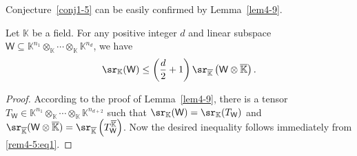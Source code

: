 Conjecture~\ref{conj1-5} can be easily confirmed by Lemma~\ref{lem4-9}.
\begin{theorem}
\label{thm:slrank-conj}
Let $\mathbb{K}$ be a field.  For any positive integer $d$ and linear subspace $\mathsf{W} \subseteq \mathbb{K}^{n_1} \otimes_{\mathbb{K}} \cdots \otimes_{\mathbb{K}} \mathbb{K}^{n_d}$,  we have 
\[
\sr_{\mathbb{K}}(\mathsf{W}) \le \left( \frac{d}{2} + 1\right)\sr_{\overline{\mathbb{K}}}\left( \mathsf{W} \otimes \overline{\mathbb{K}} \right).
\]
\end{theorem}
\begin{proof}
According to the proof of Lemma~\ref{lem4-9},  there is a tensor $T_{\mathsf{W}} \in \mathbb{K}^{n_1} \otimes_{\mathbb{K}} \cdots \otimes_{\mathbb{K}}  \mathbb{K}^{n_{d+2}}$ such that $\sr_{\mathbb{K}}(\mathsf{W})= \sr_{\mathbb{K}}(T_{\mathsf{W}})$ and $\sr_{\overline{\mathbb{K}}}(\mathsf{W} \otimes \overline{\mathbb{K}}) = \sr_{\overline{\mathbb{K}}}\left( T_{\mathsf{W}}^{\overline{\mathbb{K}}}\right)$.  Now the desired inequality follows immediately from \eqref{rem4-5:eq1}.
\end{proof}
